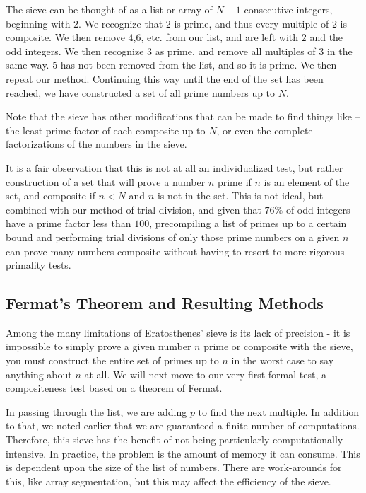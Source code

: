 \documentclass{article}
\begin{document}
\par The sieve can be thought of as a list or array of $N - 1$ consecutive integers, beginning with $2$. We recognize that $2$ is prime, and thus every multiple of $2$ is composite. We then remove $4$,$6$, etc. from our list, and are left with $2$ and the odd integers. We then recognize $3$ as prime, and remove all multiples of $3$ in the same way. $5$ has not been removed from the list, and so it is prime. We then repeat our method. Continuing this way until the end of the set has been reached, we have constructed a set of all prime numbers up to $N$.

\par Note that the sieve has other modifications that can be made to find things like -- the least prime factor of each composite up to $N$, or even the complete factorizations of the numbers in the sieve.

\par It is a fair observation that this is not at all an individualized test, but rather construction of a set that will prove a number $n$ prime if $n$ is an element of the set, and composite if $n < N$ and $n$ is not in the set. This is not ideal, but combined with our method of trial division, and given that $76\%$ of odd integers have a prime factor less than $100$, precompiling a list of primes up to a certain bound and performing trial divisions of only those prime numbers on a given $n$ can prove many numbers composite without having to resort to more rigorous primality tests.

\subsection {Fermat's Theorem and Resulting Methods}

\par Among the many limitations of Eratosthenes' sieve is its lack of precision - it is impossible to simply prove a given number $n$ prime or composite with the sieve, you must construct the entire set of primes up to $n$ in the worst case to say anything about $n$ at all. We will next move to our very first formal test, a compositeness test based on a theorem of Fermat.

\par In passing through the list, we are adding $p$ to find the next multiple. In addition to that, we noted earlier that we are guaranteed a finite number of computations. Therefore, this sieve has the benefit of not being particularly computationally intensive. In practice, the problem is the amount of memory it can consume. This is dependent upon the size of the list of numbers. There are work-arounds for this, like array segmentation, but this may affect the efficiency of the sieve.
\end{document}
